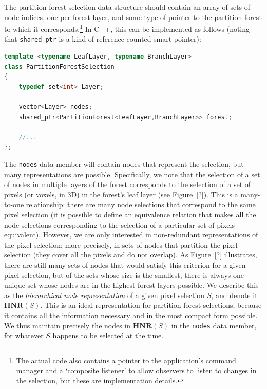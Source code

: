 The partition forest selection data structure should contain an array of sets of node indices, one per forest layer, and some type of pointer to the partition forest to which it corresponds.\footnote{The actual code also contains a pointer to the application's command manager and a `composite listener' to allow observers to listen to changes in the selection, but these are implementation details.} In C++, this can be implemented as follows (noting that \texttt{shared_ptr} is a kind of reference-counted smart pointer):

\begin{lstlisting}[style=Default,language=C++]
template <typename LeafLayer, typename BranchLayer>
class PartitionForestSelection
{
	typedef set<int> Layer;

	vector<Layer> nodes;
	shared_ptr<PartitionForest<LeafLayer,BranchLayer>> forest;

	//...
};
\end{lstlisting}

The \texttt{nodes} data member will contain nodes that represent the selection, but many representations are possible. Specifically, we note that the selection of a set of nodes in multiple layers of the forest corresponds to the selection of a set of pixels (or voxels, in 3D) in the forest's leaf layer (see Figure~\ref{?}). This is a many-to-one relationship: there are many node selections that correspond to the same pixel selection (it is possible to define an equivalence relation that makes all the node selections corresponding to the selection of a particular set of pixels equivalent). However, we are only interested in non-redundant representations of the pixel selection: more precisely, in sets of nodes that partition the pixel selection (they cover all the pixels and do not overlap). As Figure~\ref{?} illustrates, there are still many sets of nodes that would satisfy this criterion for a given pixel selection, but of the sets whose size is the smallest, there is always one unique set whose nodes are in the highest forest layers possible. We describe this as the \emph{hierarchical node representation} of a given pixel selection $S$, and denote it $\textbf{HNR}(S)$. This is an ideal representation for partition forest selections, because it contains all the information necessary and in the most compact form possible. We thus maintain precisely the nodes in $\textbf{HNR}(S)$ in the \texttt{nodes} data member, for whatever $S$ happens to be selected at the time.

